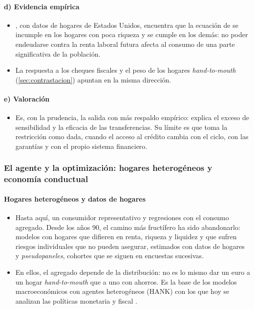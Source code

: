 \documentclass[11pt]{article}
\begin{document}
\paragraph{d) Evidencia empírica}

\begin{itemize}
\item \textcite{Zeldes1989Consumption}, con datos de hogares de Estados Unidos, encuentra que la ecuación de  se incumple en los hogares con poca riqueza y se cumple en los demás: no poder endeudarse contra la renta laboral futura afecta al consumo de una parte significativa de la población.
\item La respuesta a los cheques fiscales y el peso de los hogares \emph{hand-to-mouth} (\ref{sec:contrastacion}) apuntan en la misma dirección\nocite{KaplanViolante2014Model}.
\end{itemize}

\paragraph{e) Valoración}

\begin{itemize}
\item Es, con la prudencia, la salida con más respaldo empírico: explica el exceso de sensibilidad y la eficacia de las transferencias. Su límite es que toma la restricción como dada, cuando el acceso al crédito cambia con el ciclo, con las garantías y con el propio sistema financiero.
\end{itemize}

\subsubsection{El agente y la optimización: hogares heterogéneos y economía conductual}\label{sec:heterogeneidad}

\paragraph{Hogares heterogéneos y datos de hogares}

\begin{itemize}
\item Hasta aquí, un consumidor representativo y regresiones con el consumo agregado. Desde los años 90, el camino más fructífero ha sido abandonarlo: modelos con hogares que difieren en renta, riqueza y liquidez y que sufren riesgos individuales que no pueden asegurar, estimados con datos de hogares y \emph{pseudopaneles}, cohortes que se siguen en encuestas sucesivas\nocite{Deaton1992Understanding,AttanasioWeber2010Consumption}.
\item En ellos, el agregado depende de la distribución: no es lo mismo dar un euro a un hogar \emph{hand-to-mouth} que a uno con ahorros. Es la base de los modelos macroeconómicos con agentes heterogéneos (HANK) con los que hoy se analizan las políticas monetaria y fiscal\nocite{KaplanMollViolante2018Monetary} .
\end{itemize}
\end{document}
